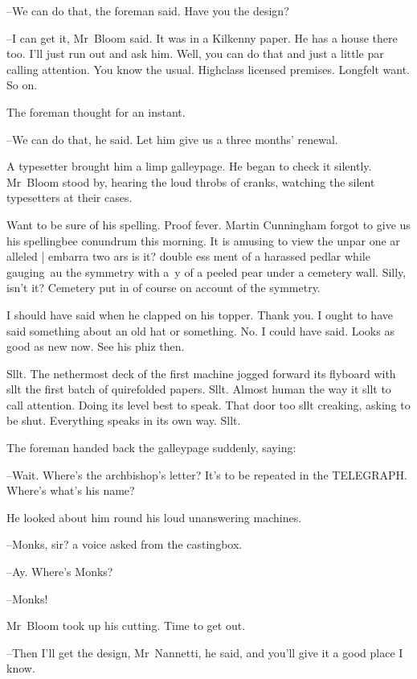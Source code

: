 --We can do that,
the foreman said.
Have you the design?

--I can get it,
Mr~Bloom said.
It was in a Kilkenny paper.
He has a house there too.
I'll just run out and ask him.
Well, you can do that and just a little par calling attention.
You know the usual.
Highclass licensed premises.
Longfelt want.
So on.

The foreman thought for an instant.

--We can do that,
he said.
Let him give us a three months' renewal.

A typesetter brought him a limp galleypage.
He began to check it silently.
Mr~Bloom stood by,
hearing the loud throbs of cranks,
watching the silent typesetters at their cases.



Want to be sure of his spelling.
Proof fever.
Martin Cunningham forgot to give us his spellingbee conundrum this morning.
It is amusing to view the
unpar one ar alleled |
embarra two ars is it?
double ess ment of a harassed pedlar
while gauging~au
the symmetry with a~y
of a peeled pear
under a cemetery wall.
Silly, isn't it?
Cemetery put in of course
on account of the symmetry.

I should have said when he clapped on his topper.
Thank you.
I ought to have said something about an old hat or something.
No.
I could have said.
Looks as good as new now.
See his phiz then.

Sllt.
The nethermost deck of the first machine
jogged forward its flyboard
with sllt
the first batch of quirefolded papers.
Sllt.
Almost human the way it sllt to call attention.
Doing its level best to speak.
That door too sllt creaking, asking to be shut.
Everything speaks in its own way.
Sllt.



The foreman handed back the galleypage suddenly,
saying:

--Wait.
Where's the archbishop's letter?
It's to be repeated in the TELEGRAPH.
Where's what's his name?

He looked about him round his loud unanswering machines.

--Monks, sir?
a voice asked from the castingbox.

--Ay.
Where's Monks?

--Monks!

Mr~Bloom took up his cutting.
Time to get out.

--Then I'll get the design, Mr~Nannetti,
he said,
and you'll give it a good place I know.

